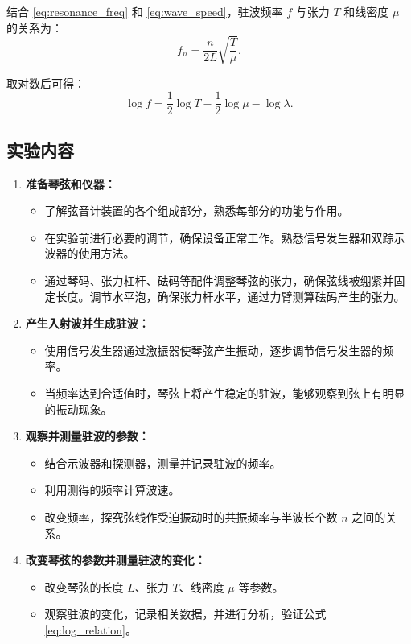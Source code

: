 \documentclass[zihao=5, UTF8]{article}
\theoremstyle{MyLineTheoremStyle} %
\theoremstyle{MyBlockTheoremStyle} %
\theoremstyle{MySubsubsectionStyle} %
\begin{document}
结合 \eqref{eq:resonance_freq} 和 \eqref{eq:wave_speed}，驻波频率 $f$ 与张力 $T$ 和线密度 $\mu$ 的关系为：
\begin{equation}
    f_n = \frac{n}{2L} \sqrt{\frac{T}{\mu}}. \label{eq:freq_tension_density}
\end{equation}

取对数后可得：
\begin{equation}
    \log f = \frac{1}{2} \log T - \frac{1}{2} \log \mu - \log \lambda. \label{eq:log_relation}
\end{equation}

\subsection{实验内容}

\begin{enumerate}
    \item \textbf{准备琴弦和仪器：}
    \begin{itemize}
        \item 了解弦音计装置的各个组成部分，熟悉每部分的功能与作用。
        \item 在实验前进行必要的调节，确保设备正常工作。熟悉信号发生器和双踪示波器的使用方法。
        \item 通过琴码、张力杠杆、砝码等配件调整琴弦的张力，确保弦线被绷紧并固定长度。调节水平泡，确保张力杆水平，通过力臂测算砝码产生的张力。
    \end{itemize}
    
    \item \textbf{产生入射波并生成驻波：}
    \begin{itemize}
        \item 使用信号发生器通过激振器使琴弦产生振动，逐步调节信号发生器的频率。
        \item 当频率达到合适值时，琴弦上将产生稳定的驻波，能够观察到弦上有明显的振动现象。
    \end{itemize}
    
    \item \textbf{观察并测量驻波的参数：}
    \begin{itemize}
        \item 结合示波器和探测器，测量并记录驻波的频率。
        \item 利用测得的频率计算波速。
        \item 改变频率，探究弦线作受迫振动时的共振频率与半波长个数 $n$ 之间的关系。
    \end{itemize}
    
    \item \textbf{改变琴弦的参数并测量驻波的变化：}
    \begin{itemize}
        \item 改变琴弦的长度 $L$、张力 $T$、线密度 $\mu$ 等参数。
        \item 观察驻波的变化，记录相关数据，并进行分析，验证公式 \eqref{eq:log_relation}。
    \end{itemize}
\end{enumerate}
\end{document}
